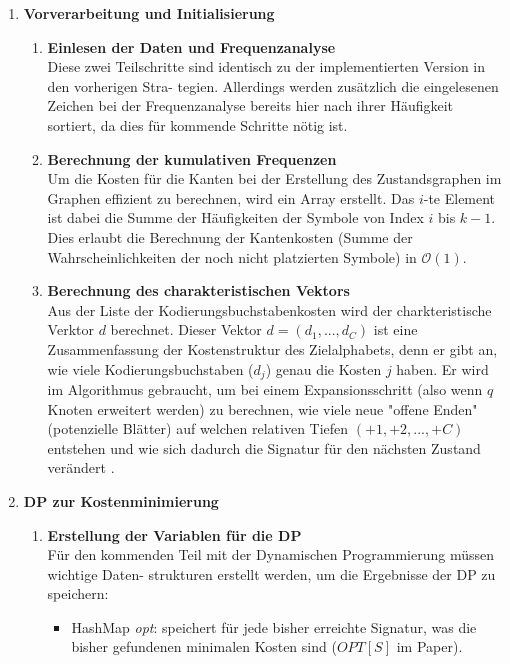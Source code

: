 \documentclass[a4paper,10pt,ngerman]{scrartcl}
\begin{document}
\begin{enumerate}
  \item \textbf{Vorverarbeitung und Initialisierung}
  \begin{enumerate}
    \item \textbf{Einlesen der Daten und Frequenzanalyse}\\
    Diese zwei Teilschritte sind identisch zu der implementierten Version in den vorherigen Stra- tegien. Allerdings werden zusätzlich die eingelesenen Zeichen bei der Frequenzanalyse bereits hier nach ihrer Häufigkeit sortiert, da dies für kommende Schritte nötig ist. 
    \item \textbf{Berechnung der kumulativen Frequenzen}\\
    Um die Kosten für die Kanten bei der Erstellung des Zustandsgraphen im Graphen effizient zu berechnen, wird ein Array erstellt. Das $i$-te Element ist dabei die Summe der Häufigkeiten der Symbole von Index $i$ bis $k-1$. Dies erlaubt die Berechnung der Kantenkosten (Summe der Wahrscheinlichkeiten der noch nicht platzierten Symbole) in $\mathcal{O}(1)$. 
    \item \textbf{Berechnung des charakteristischen Vektors}\\
    Aus der Liste der Kodierungsbuchstabenkosten wird der charkteristische Verktor $d$ berechnet. Dieser Vektor $d=(d_1, ..., d_C)$ ist eine Zusammenfassung der Kostenstruktur des Zielalphabets, denn er gibt an, wie viele Kodierungsbuchstaben ($d_j$) genau die Kosten $j$ haben. Er wird im Algorithmus gebraucht, um bei einem Expansionsschritt (also wenn $q$ Knoten erweitert werden) zu berechnen, wie viele neue "offene Enden" (potenzielle Blätter) auf welchen relativen Tiefen $(+1, +2, ..., +C)$ entstehen und wie sich dadurch die Signatur für den nächsten Zustand verändert \cite[vgl. Lemma 3]{papergolinrote}.
  \end{enumerate}
  \item \textbf{DP zur Kostenminimierung}
  \begin{enumerate}
    \item \textbf{Erstellung der Variablen für die DP}\\
    Für den kommenden Teil mit der Dynamischen Programmierung müssen wichtige Daten- strukturen erstellt werden, um die Ergebnisse der DP zu speichern: 
    \begin{itemize}
      \item HashMap \textit{opt}: speichert für jede bisher erreichte Signatur, was die bisher gefundenen minimalen Kosten sind ($OPT[S]$ im Paper).

\end{itemize}
\end{enumerate}
\end{enumerate}
\end{document}
